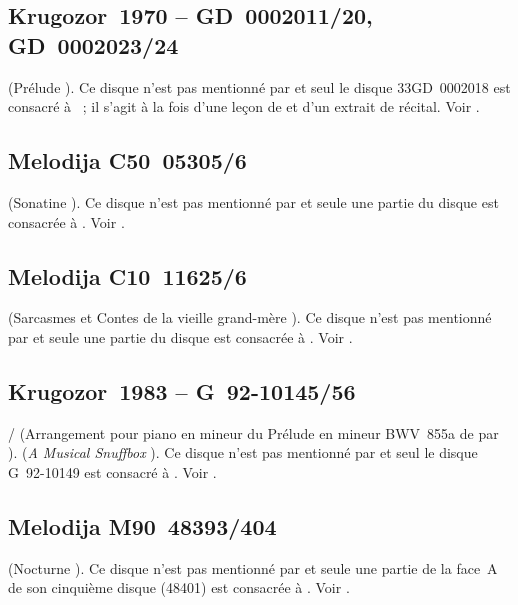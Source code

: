 \subsection{Krugozor~1970  -- GD~0002011/20, GD~0002023/24}

\Scriabine{} (Prélude  ).
Ce disque n'est pas mentionné par \INikonovich{}
\citep[voir][]{Nikonovich11} et seul le disque 33GD~0002018 est consacré à
\VSofronitsky{}~; il s'agit à la fois d'une leçon de \VSofronitsky{} et d'un
extrait de récital.
Voir \citet{Recordssu}.

\subsection{Melodija C50~05305/6}

\Kabalevski{} (Sonatine  ).
Ce disque n'est pas mentionné par \INikonovich{}
\citep[voir][]{Nikonovich11} et seule une partie du disque est consacrée à
\VSofronitsky{}.
Voir \citet{Recordssu}.

\subsection{Melodija C10~11625/6}

\Prokofiev{} (Sarcasmes  et Contes de la vieille grand-mère
).
Ce disque n'est pas mentionné par \INikonovich{}
\citep[voir][]{Nikonovich11} et seule une partie du disque est consacrée à
\VSofronitsky{}.
Voir \citet{Recordssu}.

\subsection{Krugozor~1983  -- G~92-10145/56}

\Bach{}/\Ziloti{} (Arrangement pour piano en \kB mineur du Prélude
 en \kE mineur BWV~855a de \Bach{} par \Ziloti{}).
\Liadov{} (\emph{A Musical Snuffbox} ).
Ce disque n'est pas mentionné par \INikonovich{}
\citep[voir][]{Nikonovich11} et seul le disque G~92-10149 est consacré à
\VSofronitsky{}.
Voir \citet{Recordssu}.

\subsection{Melodija M90~48393/404}

\Chopin{} (Nocturne  ).
Ce disque n'est pas mentionné par \INikonovich{}
\citep[voir][]{Nikonovich11} et seule une partie de la face~A de son
cinquième disque (48401) est consacrée à \VSofronitsky{}.
Voir \citet{Recordssu}.

